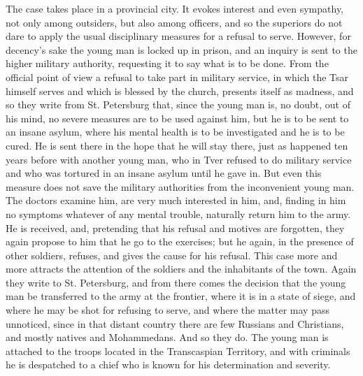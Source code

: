 \documentclass{book}
\begin{document}
The case takes place in a provincial city. It evokes interest and even sympathy, not only among outsiders, but also among officers, and so the superiors do not dare to apply the usual disciplinary measures for a refusal to serve. However, for decency’s sake the young man is locked up in prison, and an inquiry is sent to the higher military authority, requesting it to say what is to be done. From the official point of view a refusal to take part in military service, in which the Tsar himself serves and which is blessed by the church, presents itself as madness, and so they write from St. Petersburg that, since the young man is, no doubt, out of his mind, no severe measures are to be used against him, but he is to be sent to an insane asylum, where his mental health is to be investigated and he is to be cured. He is sent there in the hope that he will stay there, just as happened ten years before with another young man, who in Tver refused to do military service and who was tortured in an insane asylum until he gave in. But even this measure does not save the military authorities from the inconvenient young man. The doctors examine him, are very much interested in him, and, finding in him no symptoms whatever of any mental trouble, naturally return him to the army. He is received, and, pretending that his refusal and motives are forgotten, they again propose to him that he go to the exercises; but he again, in the presence of other soldiers, refuses, and gives the cause for his refusal. This case more and more attracts the attention of the soldiers and the inhabitants of the town. Again they write to St. Petersburg, and from there comes the decision that the young man be transferred to the army at the frontier, where it is in a state of siege, and where he may be shot for refusing to serve, and where the matter may pass unnoticed, since in that distant country there are few Russians and Christians, and mostly natives and Mohammedans. And so they do. The young man is attached to the troops located in the Transcaspian Territory, and with criminals he is despatched to a chief who is known for his determination and severity.
\end{document}
